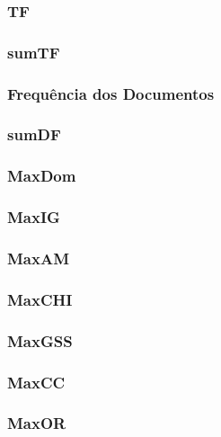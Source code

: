 \subsubsection{TF}
\label{subsubsection::tf}

\subsubsection{sumTF}
\label{subsubsection::sumtf}

\subsubsection{Frequência dos Documentos}
\label{subsubsection::df}


\subsubsection{sumDF}
\label{subsubsection::sumdf}

\subsubsection{MaxDom}
\label{subsubsection::maxdom}

\subsubsection{MaxIG}
\label{subsubsection::maxig}

\subsubsection{MaxAM}
\label{subsubsection::maxam}

\subsubsection{MaxCHI}
\label{subsubsection::maxchi}

\subsubsection{MaxGSS}
\label{subsubsection::maxgss}

\subsubsection{MaxCC}
\label{subsubsection::maxcc}

\subsubsection{MaxOR}
\label{subsubsection::maxor}

